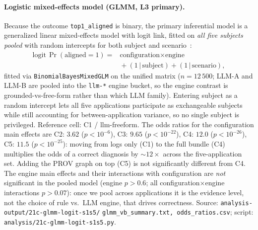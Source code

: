 \documentclass[sigconf, nonacm=true, anonymous=false, review=false]{acmart}
\newcommand{\artifactname}[1]{\nolinkurl{#1}}
\newcommand{\Cn}[1]{C#1\xspace}
\begin{document}
\paragraph{Logistic mixed-effects model (GLMM, L3 primary).}
Because the outcome \texttt{top1\_aligned} is binary, the primary
inferential model is a generalized linear mixed-effects model with
logit link, fitted on \emph{all five subjects pooled} with random
intercepts for both subject and scenario~\cite{bates_lme4_2015,
baayen_2008}:
\begin{equation}
\begin{aligned}
\text{logit}\,\Pr(\text{aligned}=1) ={}&
  \text{configuration} \times \text{engine}\\
  &{}+ (1\,|\,\text{subject}) + (1\,|\,\text{scenario}),
\end{aligned}
\end{equation}
fitted via \texttt{BinomialBayesMixedGLM} on the unified matrix
($n = 12\,500$; LLM-A and LLM-B are pooled into the \texttt{llm-*}
engine bucket, so the engine contrast is grounded-vs-free-form rather
than which LLM family). Entering subject as a random intercept lets all
five applications participate as exchangeable subjects while still
accounting for between-application variance, so no single subject is
privileged. Reference cell: \Cn{1} / llm-freeform. The odds ratios for
the configuration main effects are
\Cn{2}: $3.62$ ($p < 10^{-6}$),
\Cn{3}: $9.65$ ($p < 10^{-22}$),
\Cn{4}: \textbf{$12.0$} ($p < 10^{-26}$),
\Cn{5}: $11.5$ ($p < 10^{-25}$):
moving from logs only (\Cn{1}) to the full bundle (\Cn{4})
multiplies the odds of a correct diagnosis by ${\sim}12\times$ across
the five-application set. Adding the PROV graph on top (\Cn{5}) is not
significantly different from \Cn{4}. The engine main effects and their
interactions with configuration are \emph{not} significant in the
pooled model (engine $p > 0.6$; all configuration$\times$engine
interactions $p > 0.07$): once we pool across applications it is the
evidence level, not the choice of rule vs.\ LLM engine, that drives
correctness. Source:
\artifactname{analysis-output/21c-glmm-logit-s1s5/}
\artifactname{glmm_vb_summary.txt, odds_ratios.csv};
script: \artifactname{analysis/21c-glmm-logit-s1s5.py}.
\end{document}
